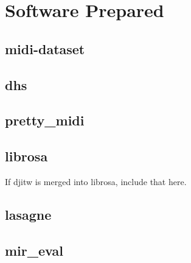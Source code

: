 \chapter{Software Prepared}

\section{midi-dataset}

\section{dhs}

\section{pretty\_midi}

\section{librosa}

If djitw is merged into librosa, include that here.

\section{lasagne}

\section{mir\_eval}
